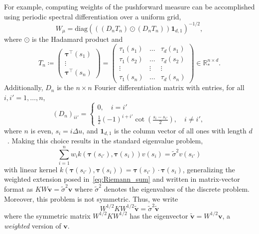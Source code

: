 \documentclass[pdflatex,iicol]{sn-jnl}%
\theoremstyle{thmstyleone}%
\theoremstyle{thmstyletwo}%
\theoremstyle{thmstylethree}%
\begin{document}
For example, computing weights of the pushforward measure can be accomplished using periodic spectral differentiation over a uniform grid,
\begin{equation} 
    W_{\mu} = \text{diag}\left( \left((D_nT_n) \odot (D_nT_n)\right)\mathbf 1_{d,1} \right)^{-1/2},
\end{equation}
where $\odot$ is the Hadamard product and 
$$
T_n \coloneqq \left( \begin{matrix}
    \boldsymbol{\tau}^{\top}(s_1)\\
    \vdots\\
    \boldsymbol{\tau}^{\top}(s_n)
\end{matrix}\right) =  \left( \begin{matrix}
    \tau_1(s_1) & \dots & \tau_d(s_1) \\
    \tau_1(s_2) & \dots & \tau_d(s_2) \\
   \vdots & \vdots &  \vdots\\
    \tau_1(s_n) & \dots & \tau_d(s_n)
\end{matrix}\right) \in \mathbb{R}^{n\times d}_*.
$$
Additionally, $D_n$ is the $n\times n$ Fourier differentiation matrix with entries, for all $i,i'=1,\dots,n$,
\begin{equation}
  (D_n)_{ii'} = \begin{cases}
        0, \quad i = i'\\
        \frac{1}{2}(-1)^{i+i'}\cot{\left(\frac{s_i - s_{i'}}{2}\right)}, \quad i \neq i',
    \end{cases}
\end{equation}
where $n$ is even, $s_{i} = i\Delta u$, and  $\mathbf 1_{d,1}$ is the column vector of all ones with length $d$~\cite{trefethen2000}. Making this choice results in the standard eigenvalue problem,
\begin{equation}\label{eq:not_naive_SVD}
    \sum_{i = 1}^n w_i k(\boldsymbol{\tau}(s_{i'}), \boldsymbol{\tau}(s_i)) v(s_i) =   \widetilde\sigma^2 v(s_{i'})
\end{equation}
with linear kernel $k(\boldsymbol{\tau}(s_{i'}), \boldsymbol{\tau}(s_i)) = \boldsymbol{\tau}(s_{i'})\cdot \boldsymbol{\tau}(s_i)$, generalizing the weighted extension posed in~\eqref{eq:Riemann_sum} and written in matrix-vector format as $KW\boldsymbol{v} = \widetilde\sigma^2 \boldsymbol{v}$ where $\widetilde\sigma^2 $ denotes the eigenvalues of the discrete problem. Moreover, this problem is not symmetric. Thus, we write
\begin{equation}\label{eq:weighted_evecs}
    W^{1/2}KW^{1/2} \widetilde{\boldsymbol{v}}  = \widetilde\sigma^2 \widetilde{\boldsymbol{v}}
\end{equation}
where the symmetric matrix $W^{1/2}KW^{1/2}$ has the eigenvector $\widetilde{\boldsymbol{v}} =W^{1/2}\boldsymbol{v}$, %
a \textit{weighted} version of  $\boldsymbol{v}$. 
\end{document}
